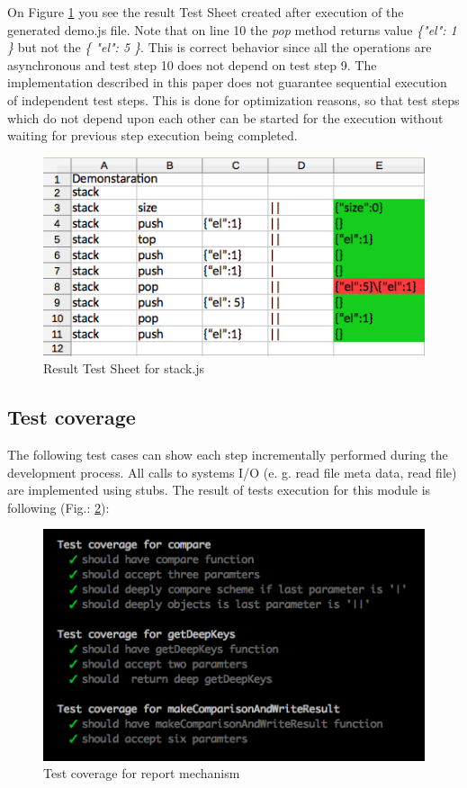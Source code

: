 {On Figure \ref{fig:resultTestSheet} you see the result Test Sheet created after execution of the generated demo.js file. Note that on line 10 the \textit{pop} method returns value \textit{\{"el": 1 \}} but not the \textit{\{ "el": 5 \}}. This is correct behavior since all the operations are asynchronous and test step 10 does not depend on test step 9. The implementation described in this paper does not guarantee sequential execution of independent test steps. This is done for optimization reasons, so that test steps which do not depend upon each other can be started for the execution without waiting for previous step execution being completed. 
\begin{figure}[H]
	\centering
	\includegraphics[width=\linewidth]{grafiken/testSheetResult.png}
	\caption{Result Test Sheet for stack.js}
	\label{fig:resultTestSheet}
\end{figure}


\subsection{Test coverage}
The following test cases can show each step incrementally performed during the development process. All calls to systems I/O (e. g. read file meta data, read file) are implemented using stubs.
The result of tests execution  for this module is following (Fig.: \ref{fig:testReport}): 
\begin{figure}[H]
	\centering
	\includegraphics[width=\linewidth]{grafiken/testReport.png}
	\caption{Test coverage for report mechanism}
	\label{fig:testReport}
\end{figure}

}
